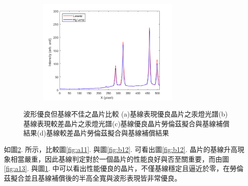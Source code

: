 \begin{figure}[H]
\begin{subfigure}[fig nice]{0.49\textwidth}
	\includegraphics[width=7cm]{figures/badbase_hg_lorentz.png}
	\caption{}
	\label{fig:b14}
\end{subfigure}
	\caption[波形優良但基線不佳之晶片比較]{波形優良但基線不佳之晶片比較 (a)基線表現優良晶片之汞燈光譜(b)基線表現較差晶片之汞燈光譜(c)基線優良晶片勞倫茲擬合與基線補償結果(d)基線較差晶片勞倫茲擬合與基線補償結果}
	\label{fig:all1}
\end{figure} 
如圖\ref{fig:all1}. 所示，比較圖\ref{fig:a11}. 與圖\ref{fig:b12}. 可看出圖\ref{fig:b12}. 晶片的基線升高現象相當嚴重，因此基線判定對於一個晶片的性能良好與否至關重要，而由圖\ref{fig:a13}. 與圖\ref{fig:b14}. 中可以看出性能優良的晶片，不僅基線穩定且逼近於零，在勞倫茲擬合並且基線補償後的半高全寬與波形表現皆非常優良。
